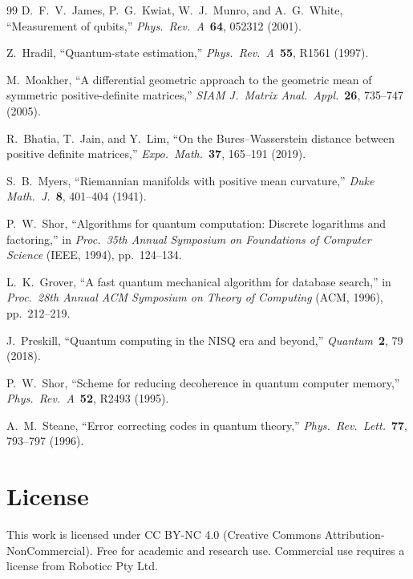 \documentclass[12pt,a4paper]{article}
\begin{document}
\begin{thebibliography}{99}
D.~F.~V.~James, P.~G.~Kwiat, W.~J.~Munro, and A.~G.~White,
``Measurement of qubits,''
\textit{Phys.\ Rev.\ A}\ \textbf{64}, 052312 (2001).

Z.~Hradil, ``Quantum-state estimation,''
\textit{Phys.\ Rev.\ A}\ \textbf{55}, R1561 (1997).

M.~Moakher, ``A differential geometric approach to the geometric mean of symmetric positive-definite matrices,''
\textit{SIAM J.\ Matrix Anal.\ Appl.}\ \textbf{26}, 735--747 (2005).

R.~Bhatia, T.~Jain, and Y.~Lim, ``On the Bures--Wasserstein distance between positive definite matrices,''
\textit{Expo.\ Math.}\ \textbf{37}, 165--191 (2019).

S.~B.~Myers, ``Riemannian manifolds with positive mean curvature,''
\textit{Duke Math.\ J.}\ \textbf{8}, 401--404 (1941).

P.~W.~Shor, ``Algorithms for quantum computation: Discrete logarithms and factoring,''
in \textit{Proc.\ 35th Annual Symposium on Foundations of Computer Science} (IEEE, 1994), pp.~124--134.

L.~K.~Grover, ``A fast quantum mechanical algorithm for database search,''
in \textit{Proc.\ 28th Annual ACM Symposium on Theory of Computing} (ACM, 1996), pp.~212--219.

J.~Preskill, ``Quantum computing in the NISQ era and beyond,''
\textit{Quantum}\ \textbf{2}, 79 (2018).

P.~W.~Shor, ``Scheme for reducing decoherence in quantum computer memory,''
\textit{Phys.\ Rev.\ A}\ \textbf{52}, R2493 (1995).

A.~M.~Steane, ``Error correcting codes in quantum theory,''
\textit{Phys.\ Rev.\ Lett.}\ \textbf{77}, 793--797 (1996).

\end{thebibliography}

\section*{License}

This work is licensed under CC BY-NC 4.0 (Creative Commons Attribution-NonCommercial). Free for academic and research use. Commercial use requires a license from Roboticc Pty Ltd.
\end{document}
